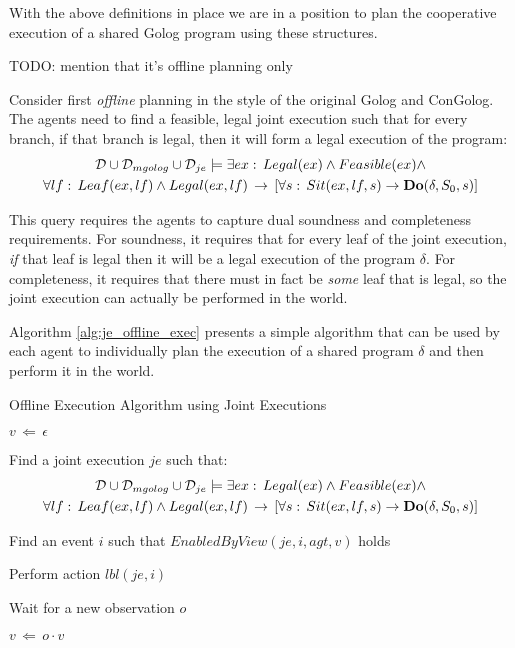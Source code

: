 With the above definitions in place we are in a position to plan the
cooperative execution of a shared Golog program using these structures.

TODO: mention that it's offline planning only

Consider first \emph{offline} planning in the style of the original
Golog and ConGolog. The agents need to find a feasible, legal joint
execution such that for every branch, if that branch is legal, then
it will form a legal execution of the program:\begin{multline*}
\mathcal{D}\cup\mathcal{D}_{mgolog}\cup\mathcal{D}_{je}\models\exists ex:\, Legal(ex)\wedge Feasible(ex)\wedge\\
\forall lf:\, Leaf(ex,lf)\wedge Legal(ex,lf)\,\rightarrow\,\left[\forall s:\, Sit(ex,lf,s)\rightarrow\mathbf{Do}(\delta,S_{0},s)\right]\end{multline*}


This query requires the agents to capture dual soundness and completeness
requirements. For soundness, it requires that for every leaf of the
joint execution, \emph{if} that leaf is legal then it will be a legal
execution of the program $\delta$. For completeness, it requires
that there must in fact be \emph{some} leaf that is legal, so the
joint execution can actually be performed in the world.

Algorithm \ref{alg:je_offline_exec} presents a simple algorithm that
can be used by each agent to individually plan the execution of a
shared program $\delta$ and then perform it in the world.

%
\begin{algorithm}[t]
\caption{Offline Execution Algorithm using Joint Executions}


\label{alg:je_offline_exec} \begin{algorithmic}

\STATE

\STATE $v\,\Leftarrow\,\epsilon$

\STATE Find a joint execution $je$ such that:\begin{multline*}
\mathcal{D}\cup\mathcal{D}_{mgolog}\cup\mathcal{D}_{je}\models\exists ex:\, Legal(ex)\wedge Feasible(ex)\wedge\\
\forall lf:\, Leaf(ex,lf)\wedge Legal(ex,lf)\,\rightarrow\,\left[\forall s:\, Sit(ex,lf,s)\rightarrow\mathbf{Do}(\delta,S_{0},s)\right]\end{multline*}



\STATE Find an event $i$ such that $EnabledByView(je,i,agt,v)$
holds


\STATE Perform action $lbl(je,i)$

\ENDIF

\STATE Wait for a new observation $o$

\STATE $v\,\Leftarrow\, o\cdot v$

\ENDWHILE

\end{algorithmic} 
\end{algorithm}



